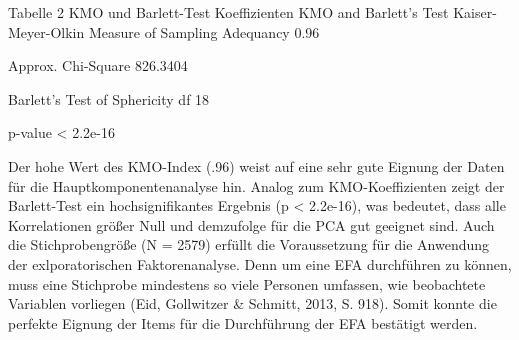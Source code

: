 \documentclass[12pt,a4paper]{article}
\begin{document}
Tabelle 2
KMO und Barlett-Test Koeffizienten
KMO and Barlett's Test
Kaiser-Meyer-Olkin Measure of Sampling Adequancy                 0.96
                                                      
                                                      Approx. Chi-Square                  826.3404

Barlett's Test of Sphericity                              df                             18
 
                                                                   p-value                         < 2.2e-16
							
Der hohe Wert des KMO-Index (.96) weist auf eine sehr gute Eignung der Daten für die Hauptkomponentenanalyse hin. Analog zum KMO-Koeffizienten zeigt der Barlett-Test ein hochsignifikantes Ergebnis (p < 2.2e-16), was bedeutet, dass alle Korrelationen größer Null und demzufolge für die PCA gut geeignet sind. Auch die Stichprobengröße (N = 2579) erfüllt die Voraussetzung für die Anwendung der exlporatorischen Faktorenanalyse. Denn um eine EFA durchführen zu können, muss eine Stichprobe mindestens so viele Personen umfassen, wie beobachtete Variablen vorliegen (Eid, Gollwitzer \& Schmitt, 2013, S. 918). Somit konnte die perfekte Eignung der Items für die Durchführung der EFA bestätigt werden.
\end{document}
